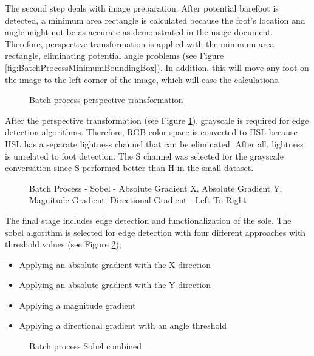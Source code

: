The second step deals with image preparation. After potential barefoot is detected, a minimum area rectangle is calculated because the foot's location and angle might not be as accurate as demonstrated in the usage document. Therefore, perspective transformation is applied with the minimum area rectangle, eliminating potential angle problems (see Figure \ref{fig:BatchProcessMinimumBoundingBox}). In addition, this will move any foot on the image to the left corner of the image, which will ease the calculations.

\begin{figure}[htbp]
\centering
{}
\caption{Batch process perspective transformation}
\label{fig:BatchProcessPerspectiveTransformation}
\end{figure}

After the perspective transformation (see Figure \ref{fig:BatchProcessPerspectiveTransformation}), grayscale is required for edge detection algorithms. Therefore, RGB color space is converted to HSL because HSL has a separate lightness channel that can be eliminated. After all, lightness is unrelated to foot detection. The S channel was selected for the grayscale conversation since S performed better than H in the small dataset.

\begin{figure}[htbp]
\centering
{}
\caption{Batch Process - Sobel - Absolute Gradient X, Absolute Gradient Y, Magnitude Gradient, Directional Gradient - Left To Right}
\label{fig:BatchProcessSobelOutput}
\end{figure}

The final stage includes edge detection and functionalization of the sole. The sobel algorithm is selected for edge detection with four different approaches with threshold values (see Figure \ref{fig:BatchProcessSobelOutput});

\begin{itemize}
  \item Applying an absolute gradient with the X direction
  \item Applying an absolute gradient with the Y direction
  \item Applying a magnitude gradient
  \item Applying a directional gradient with an angle threshold 
\end{itemize}

\begin{figure}[htbp]
\centering
{}
\caption{Batch process Sobel combined}
\label{fig:BatchProcessEdge}
\end{figure}

